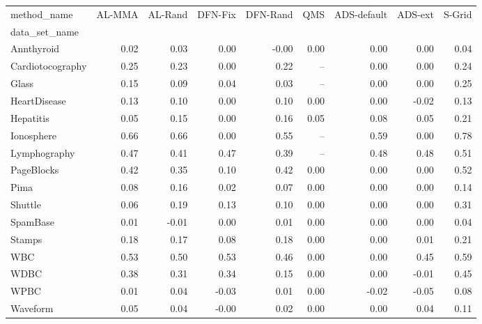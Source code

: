 \begin{tabular}{lrrrrrrrr}
\toprule
method\_name &  AL-MMA &  AL-Rand &  DFN-Fix &  DFN-Rand &  QMS &  ADS-default &  ADS-ext &  S-Grid \\
data\_set\_name    &         &          &          &           &      &              &          &         \\
\midrule
Annthyroid       &    0.02 &     0.03 &     0.00 &     -0.00 & 0.00 &         0.00 &     0.00 &    0.04 \\
Cardiotocography &    0.25 &     0.23 &     0.00 &      0.22 &   -- &         0.00 &     0.00 &    0.24 \\
Glass            &    0.15 &     0.09 &     0.04 &      0.03 &   -- &         0.00 &     0.00 &    0.25 \\
HeartDisease     &    0.13 &     0.10 &     0.00 &      0.10 & 0.00 &         0.00 &    -0.02 &    0.13 \\
Hepatitis        &    0.05 &     0.15 &     0.00 &      0.16 & 0.05 &         0.08 &     0.05 &    0.21 \\
Ionosphere       &    0.66 &     0.66 &     0.00 &      0.55 &   -- &         0.59 &     0.00 &    0.78 \\
Lymphography     &    0.47 &     0.41 &     0.47 &      0.39 &   -- &         0.48 &     0.48 &    0.51 \\
PageBlocks       &    0.42 &     0.35 &     0.10 &      0.42 & 0.00 &         0.00 &     0.00 &    0.52 \\
Pima             &    0.08 &     0.16 &     0.02 &      0.07 & 0.00 &         0.00 &     0.00 &    0.14 \\
Shuttle          &    0.06 &     0.19 &     0.13 &      0.10 & 0.00 &         0.00 &     0.00 &    0.31 \\
SpamBase         &    0.01 &    -0.01 &     0.00 &      0.01 & 0.00 &         0.00 &     0.00 &    0.04 \\
Stamps           &    0.18 &     0.17 &     0.08 &      0.18 & 0.00 &         0.00 &     0.01 &    0.21 \\
WBC              &    0.53 &     0.50 &     0.53 &      0.46 & 0.00 &         0.00 &     0.45 &    0.59 \\
WDBC             &    0.38 &     0.31 &     0.34 &      0.15 & 0.00 &         0.00 &    -0.01 &    0.45 \\
WPBC             &    0.01 &     0.04 &    -0.03 &      0.01 & 0.00 &        -0.02 &    -0.05 &    0.08 \\
Waveform         &    0.05 &     0.04 &    -0.00 &      0.02 & 0.00 &         0.00 &     0.04 &    0.11 \\
\bottomrule
\end{tabular}
